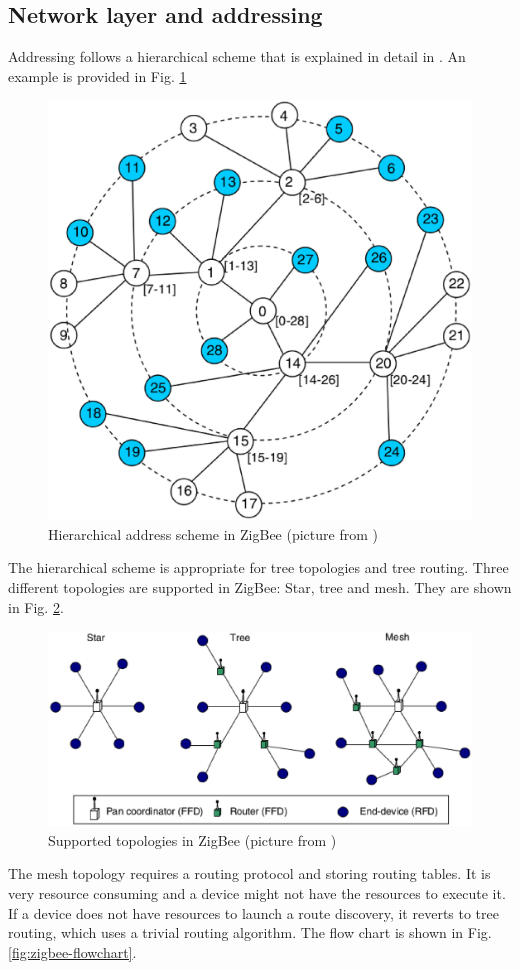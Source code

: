 \subsection{Network layer and addressing}

Addressing follows a hierarchical scheme that is explained in detail in \cite{baronti2007wsn}.
An example is provided in Fig. \ref{fig:hierarchical_addressing}

\begin{figure}[htbp]
  \centering
  \includegraphics[width=0.4\linewidth]{figures/hierarchical_addressing.eps}
  \caption{Hierarchical address scheme in ZigBee (picture from \cite{baronti2007wsn})}
  \label{fig:hierarchical_addressing}
\end{figure}

The hierarchical scheme is appropriate for tree topologies and tree routing.
Three different topologies are supported in ZigBee: Star, tree and mesh.
They are shown in Fig. \ref{fig:zigbee-topologies}.

\begin{figure}[htbp]
  \centering
  \includegraphics[width=0.6\linewidth]{figures/zigbee-topologies.eps}
  \caption{Supported topologies in ZigBee (picture from \cite{baronti2007wsn})}
  \label{fig:zigbee-topologies}
\end{figure}

The mesh topology requires a routing protocol and storing routing tables. 
It is very resource consuming and a device might not have the resources to execute it.
If a device does not have resources to launch a route discovery, it reverts to tree routing, which uses a trivial routing algorithm.
The flow chart is shown in Fig. \ref{fig:zigbee-flowchart}.

